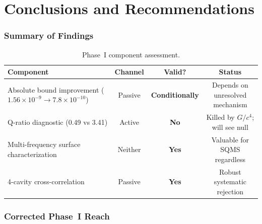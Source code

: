 \documentclass[11pt]{article}
\newcommand{\ee}[1]{\times 10^{#1}}
\theoremstyle{definition}
\theoremstyle{remark}
\begin{document}
\part{Conclusions and Recommendations}
\label{part:conclusions}


\section{Summary of Findings}
\label{sec:summary}

\begin{table}[H]
\centering
\caption{Phase~I component assessment.}
\label{tab:assessment}
\renewcommand{\arraystretch}{1.3}
\begin{tabular}{@{}p{4cm}ccc@{}}
\toprule
\textbf{Component} & \textbf{Channel} & \textbf{Valid?} &
  \textbf{Status} \\
\midrule
Absolute bound improvement ($1.56\ee{-9} \to 7.8\ee{-10}$) &
  Passive & \textbf{Conditionally} & Depends on unresolved mechanism \\
Q-ratio diagnostic (0.49 vs 3.41) &
  Active & \textbf{No} & Killed by $G/c^4$; will see null \\
Multi-frequency surface characterization &
  Neither & \textbf{Yes} & Valuable for SQMS regardless \\
4-cavity cross-correlation &
  Passive & \textbf{Yes} & Robust systematic rejection \\
\bottomrule
\end{tabular}
\end{table}


\section{Corrected Phase~I Reach}
\label{sec:corrected_reach}
\end{document}
